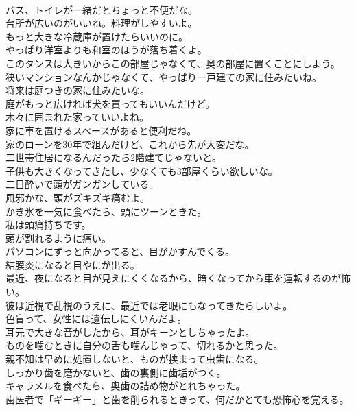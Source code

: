\documentclass[8pt]{extreport}
\begin{document}
\begin{CJK}{UTF8}{min}
\\	バス、トイレが一緒だとちょっと不便だな。	
\\	台所が広いのがいいね。料理がしやすいよ。	
\\	もっと大きな冷蔵庫が置けたらいいのに。	
\\	やっぱり洋室よりも和室のほうが落ち着くよ。	
\\	このタンスは大きいからこの部屋じゃなくて、奥の部屋に置くことにしよう。	
\\	狭いマンションなんかじゃなくて、やっぱり一戸建ての家に住みたいね。	
\\	将来は庭つきの家に住みたいな。	
\\	庭がもっと広ければ犬を買ってもいいんだけど。	
\\	木々に囲まれた家っていいよね。	
\\	家に車を置けるスペースがあると便利だね。	
\\	家のローンを30年で組んだけど、これから先が大変だな。	
\\	二世帯住居になるんだったら2階建てじゃないと。	
\\	子供も大きくなってきたし、少なくても3部屋くらい欲しいな。	
\\	二日酔いで頭がガンガンしている。	
\\	風邪かな、頭がズキズキ痛むよ。	
\\	かき氷を一気に食べたら、頭にツーンときた。	
\\	私は頭痛持ちです。	
\\	頭が割れるように痛い。	
\\	パソコンにずっと向かってると、目がかすんでくる。	
\\	結膜炎になると目やにが出る。	
\\	最近、夜になると目が見えにくくなるから、暗くなってから車を運転するのが怖い。	
\\	彼は近視で乱視のうえに、最近では老眼にもなってきたらしいよ。	
\\	色盲って、女性には遺伝しにくいんだよ。	
\\	耳元で大きな音がしたから、耳がキーンとしちゃったよ。	
\\	ものを噛むときに自分の舌も噛んじゃって、切れるかと思った。	
\\	親不知は早めに処置しないと、ものが挟まって虫歯になる。	
\\	しっかり歯を磨かないと、歯の裏側に歯垢がつく。	
\\	キャラメルを食べたら、奥歯の詰め物がとれちゃった。	
\\	歯医者で「ギーギー」と歯を削られるときって、何だかとても恐怖心を覚える。	

\end{CJK}
\end{document}
